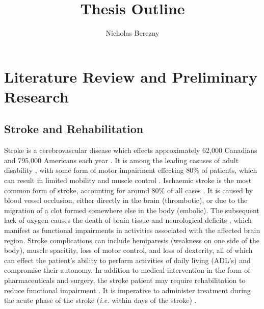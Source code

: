 \documentclass[12pt]{report}
\author{Nicholas Berezny}
\title{Thesis Outline}
\begin{document}
\maketitle
\newpage

\chapter{Literature Review and Preliminary Research}

\section{Stroke and Rehabilitation}

Stroke is a cerebrovascular disease which effects approximately 62,000 Canadians and 795,000 Americans each year \cite{Benjamin2018,Hebert2016}. It is among the leading casuses of adult disability \cite{Ewart2003}, with some form of motor impairment effecting 80\% of patients, which can result in limited mobility and muscle control \cite{Langhorne2009}. Ischaemic stroke is the most common form of stroke, accounting for around 80\% of all cases \cite{Rey2008}. It is caused by blood vessel occlusion, either directly in the brain (thrombotic), or due to the migration of a clot formed somewhere else in the body (embolic). The subsequent lack of oxygen causes the death of brain tissue and neurological deficits \cite{Prabhakaran2015}, which manifest as functional impairments in activities associated with the affected brain region. Stroke complications can include hemiparesis (weakness on one side of the body), muscle spacitity, loss of motor control, and loss of dexterity, all of which can effect the patient's ability to perform activities of daily living (ADL's) and compromise their autonomy. In addition to medical intervention in the form of pharmaceuticals and surgery, the stroke patient may require rehabilitation to reduce functional impairment \cite{Stroke}. It is imperative to administer treatment during the acute phase of the stroke (\textit{i.e.} within days of the stroke) \cite{Prabhakaran2015}.

\end{document}
